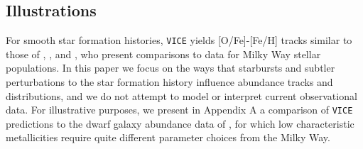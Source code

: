 \subsection{Illustrations}
For smooth star formation histories, \texttt{VICE} yields
[O/Fe]-[Fe/H] tracks similar to those of
\citet{Andrews2017}, \citet{Weinberg2017b}, 
and \citet{Freudenburg2017}, who present comparisons to data
for Milky Way stellar populations.  In this paper we focus on the ways
that starbursts and subtler perturbations to the star formation
history influence abundance tracks and distributions, and we do not
attempt to model or interpret current observational data.  For illustrative
purposes, we present in Appendix A a comparison of \texttt{VICE} 
predictions to the dwarf galaxy abundance data of 
\cite{Kirby2010}, for which low characteristic metallicities
require quite different parameter choices from the Milky Way.
